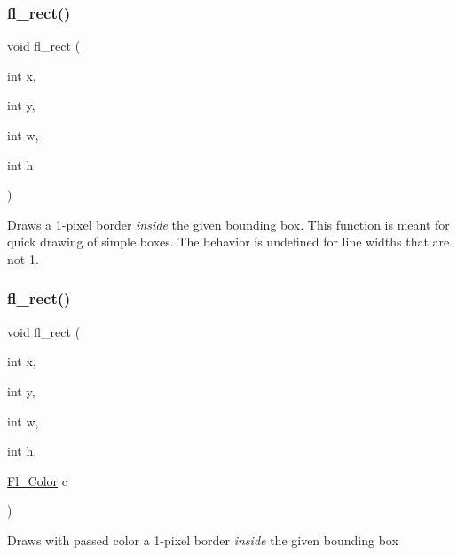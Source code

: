 \subsubsection{\texorpdfstring{fl\+\_\+rect()}{fl\_rect()}\hspace{0.1cm}{\footnotesize\ttfamily [1/2]}}
{\footnotesize\ttfamily void fl\+\_\+rect (\begin{DoxyParamCaption}\item[{int}]{x,  }\item[{int}]{y,  }\item[{int}]{w,  }\item[{int}]{h }\end{DoxyParamCaption})\hspace{0.3cm}{\ttfamily [inline]}}

Draws a 1-\/pixel border {\itshape inside} the given bounding box. This function is meant for quick drawing of simple boxes. The behavior is undefined for line widths that are not 1. \mbox{\label{group__fl__drawings_gae09f4c1d37871f3530229ede20631d1e}} 
\subsubsection{\texorpdfstring{fl\+\_\+rect()}{fl\_rect()}\hspace{0.1cm}{\footnotesize\ttfamily [2/2]}}
{\footnotesize\ttfamily void fl\+\_\+rect (\begin{DoxyParamCaption}\item[{int}]{x,  }\item[{int}]{y,  }\item[{int}]{w,  }\item[{int}]{h,  }\item[{\hyperlink{_enumerations_8_h_a8b762953646f8abee866061f1af78a6a}{Fl\+\_\+\+Color}}]{c }\end{DoxyParamCaption})\hspace{0.3cm}{\ttfamily [inline]}}

Draws with passed color a 1-\/pixel border {\itshape inside} the given bounding box \mbox{\label{group__fl__drawings_ga2986a868e9cc8d9141acde94c0fe8ab0}} 
